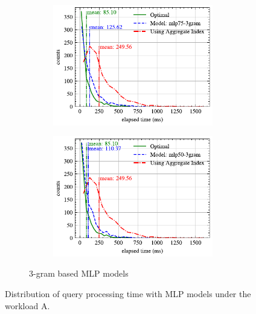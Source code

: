 \documentclass[conference]{IEEEtran}
\begin{document}
\begin{figure}[!th]
\begin{subfigure}{0.45\textwidth}
\begin{subfigure}{\textwidth}
			\centering
%			
			\includegraphics[]{graphics/perf_dist_mlp75_3gram_A.pdf}
		\end{subfigure}
		\vfill
		\begin{subfigure}{\textwidth}
			\centering
%			
			\includegraphics[]{graphics/perf_dist_mlp50_3gram_A.pdf}
		\end{subfigure}
		\caption{3-gram based MLP models}
	\end{subfigure}
	\caption{Distribution of query processing time with MLP models under the workload A.}
	\label{fig:mlp_perf_all_A}
\end{figure}
\end{document}
